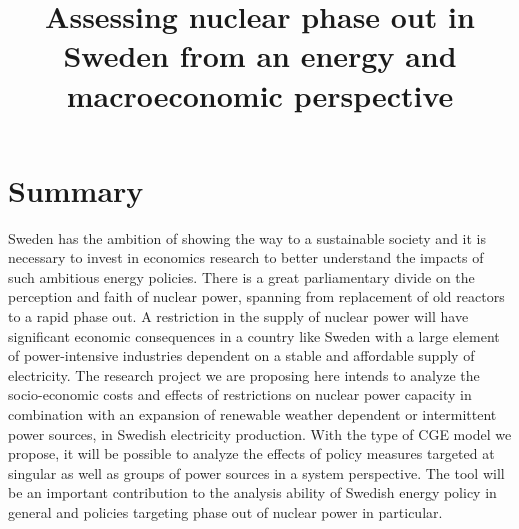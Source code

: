 


\begin{comment}
Evaluation criteria
* Criteria of Scientific Quality (most important)
	1 Research question
	2 Method and performance
	3 Scientific competence
* Criteria of Societal Value
	4 Societal value of research question
	5 Communication with stakeholders/end users
\end{comment}

\title{Assessing nuclear phase out in Sweden from an energy and macroeconomic perspective}
\maketitle
\author{}
\date{}
\section{Summary}
Sweden has the ambition of showing the way to a sustainable society and it is necessary to invest in economics research to better understand the impacts of such ambitious energy policies. There is a great parliamentary divide on the perception and faith of nuclear power, spanning from replacement of old reactors to a rapid phase out. A restriction in the supply of nuclear power will have significant economic consequences in a country like Sweden with a large element of power-intensive industries dependent on a stable and affordable supply of electricity. The research project we are proposing here intends to analyze the socio-economic costs and effects of restrictions on nuclear power capacity in combination with an expansion of renewable weather dependent or intermittent power sources, in Swedish electricity production. With the type of CGE model we propose, it will be possible to analyze the effects of policy measures targeted at singular as well as groups of power sources in a system perspective. The tool will be an important contribution to the analysis ability of Swedish energy policy in general and policies targeting phase out of nuclear power in particular.
